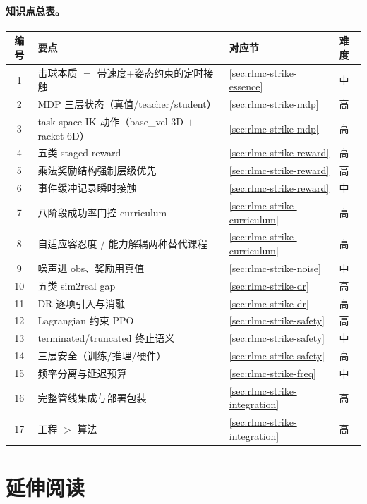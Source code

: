 \paragraph{知识点总表。}
\begin{center}
\small
\begin{tabular}{@{}clll@{}}
\toprule
编号 & 要点 & 对应节 & 难度 \\
\midrule
1 & 击球本质 $=$ 带速度+姿态约束的定时接触 & \cref{sec:rlmc-strike-essence} & 中 \\
2 & MDP 三层状态（真值/teacher/student） & \cref{sec:rlmc-strike-mdp} & 高 \\
3 & task-space IK 动作（base\_vel 3D $+$ racket 6D） & \cref{sec:rlmc-strike-mdp} & 高 \\
4 & 五类 staged reward & \cref{sec:rlmc-strike-reward} & 高 \\
5 & 乘法奖励结构强制层级优先 & \cref{sec:rlmc-strike-reward} & 高 \\
6 & 事件缓冲记录瞬时接触 & \cref{sec:rlmc-strike-reward} & 中 \\
7 & 八阶段成功率门控 curriculum & \cref{sec:rlmc-strike-curriculum} & 高 \\
8 & 自适应容忍度 / 能力解耦两种替代课程 & \cref{sec:rlmc-strike-curriculum} & 高 \\
9 & 噪声进 obs、奖励用真值 & \cref{sec:rlmc-strike-noise} & 中 \\
10 & 五类 sim2real gap & \cref{sec:rlmc-strike-dr} & 高 \\
11 & DR 逐项引入与消融 & \cref{sec:rlmc-strike-dr} & 高 \\
12 & Lagrangian 约束 PPO & \cref{sec:rlmc-strike-safety} & 高 \\
13 & terminated/truncated 终止语义 & \cref{sec:rlmc-strike-safety} & 中 \\
14 & 三层安全（训练/推理/硬件） & \cref{sec:rlmc-strike-safety} & 高 \\
15 & 频率分离与延迟预算 & \cref{sec:rlmc-strike-freq} & 中 \\
16 & 完整管线集成与部署包装 & \cref{sec:rlmc-strike-integration} & 高 \\
17 & 工程 $>$ 算法 & \cref{sec:rlmc-strike-integration} & 高 \\
\bottomrule
\end{tabular}
\end{center}

\section*{延伸阅读}
\label{sec:rlmc-strike-further}

